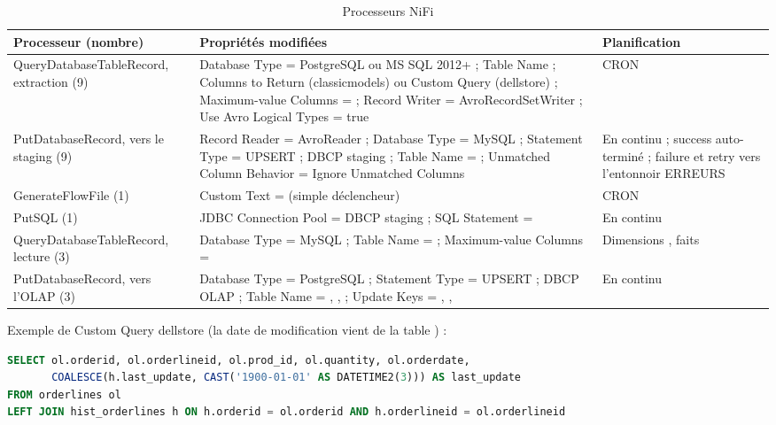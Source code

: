 \documentclass[11pt,a4paper]{article}
\begin{document}
\begin{table}[H]
\centering\footnotesize
\begin{tabularx}{\linewidth}{L{3.3cm} Y L{3.2cm}}
\toprule
\textbf{Processeur (nombre)} & \textbf{Propriétés modifiées} & \textbf{Planification} \\
\midrule
QueryDatabase\-TableRecord, extraction (9) & Database Type = PostgreSQL ou MS SQL 2012+ ; Table Name ;
  Columns to Return (classicmodels) ou Custom Query (dellstore) ; Maximum-value Columns =  ;
  Record Writer = AvroRecordSetWriter ; Use Avro Logical Types = true & CRON  \\
PutDatabaseRecord, vers le staging (9) & Record Reader = AvroReader ; Database Type = MySQL ;
  Statement Type = UPSERT ; DBCP staging ; Table Name =  ;
  Unmatched Column Behavior = Ignore Unmatched Columns & En continu ; success auto-terminé ;
  failure et retry vers l'entonnoir ERREURS \\
GenerateFlowFile (1) & Custom Text =  (simple déclencheur) & CRON  \\
PutSQL (1) & JDBC Connection Pool = DBCP staging ; SQL Statement =  & En continu \\
QueryDatabase\-TableRecord, lecture  (3) & Database Type = MySQL ; Table Name =  ;
  Maximum-value Columns =  & Dimensions , faits  \\
PutDatabaseRecord, vers l'OLAP (3) & Database Type = PostgreSQL ; Statement Type = UPSERT ; DBCP OLAP ;
  Table Name = , ,  ;
  Update Keys = , ,  & En continu \\
\bottomrule
\end{tabularx}
\caption{Processeurs NiFi}
\end{table}

Exemple de Custom Query dellstore (la date de modification vient de la table ) :

\begin{lstlisting}[language=SQL]
SELECT ol.orderid, ol.orderlineid, ol.prod_id, ol.quantity, ol.orderdate,
       COALESCE(h.last_update, CAST('1900-01-01' AS DATETIME2(3))) AS last_update
FROM orderlines ol
LEFT JOIN hist_orderlines h ON h.orderid = ol.orderid AND h.orderlineid = ol.orderlineid
\end{lstlisting}
\end{document}
